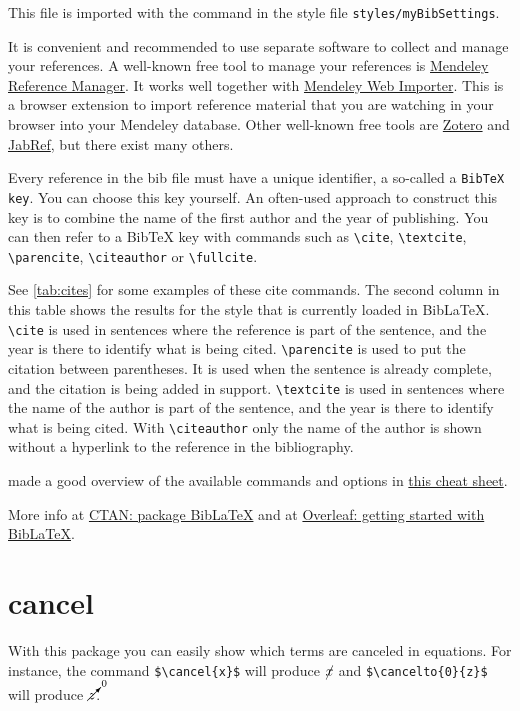 This file is imported with the command \verb|| in the style file \verb|styles/myBibSettings|. 

It is convenient and recommended to use separate software to collect and manage your references. A well-known free tool to manage your references is \href{https://www.mendeley.com/}{Mendeley Reference Manager}. It works well together with \href{https://www.mendeley.com/reference-management/web-importer}{Mendeley Web Importer}. This is a browser extension to import reference material that you are watching in your browser into your Mendeley database.  Other well-known free tools are \href{https://www.zotero.org/}{Zotero} and \href{https://www.jabref.org/}{JabRef}, but there exist many others.

Every reference in the bib file must have a unique identifier, a so-called a \verb|BibTeX key|. You can choose this key yourself. An often-used approach to construct this key is to combine the name of the first author and the year of publishing. You can then refer to a BibTeX key with commands such as \verb|\cite|, \verb|\textcite|, \verb|\parencite|, \verb|\citeauthor| or \verb|\fullcite|. 

See \cref{tab:cites} for some examples of these cite commands. The second column in this table shows the results for the style that is currently loaded in BibLaTeX. \verb|\cite| is used in sentences where the reference is part of the sentence, and the year is there to identify what is being cited. \verb|\parencite| is used to put the citation between parentheses. It is used when the sentence is already complete, and the citation is being added in support. \verb|\textcite| is used in sentences where the name of the author is part of the sentence, and the year is there to identify what is being cited. With \verb|\citeauthor| only the name of the author is shown without a hyperlink to the reference in the bibliography. 

\textcite{Rees2017} made a good overview of the available commands and options in  \href{https://tug.ctan.org/info/biblatex-cheatsheet/biblatex-cheatsheet.pdf}{this cheat sheet}.

More info at \href{https://ctan.org/pkg/biblatex?lang=en}{CTAN: package BibLaTeX} and at \href{https://www.overleaf.com/learn/latex/Articles/Getting_started_with_BibLaTeX}{Overleaf: getting started with BibLaTeX}.

\section{cancel}\label{sec:cancel}
With this package you can easily show which terms are canceled in equations. For instance, the command \verb|$\cancel{x}$| will produce $\cancel{x}$ and \verb|$\cancelto{0}{z}$| will produce $\cancelto{0}{z}$.

